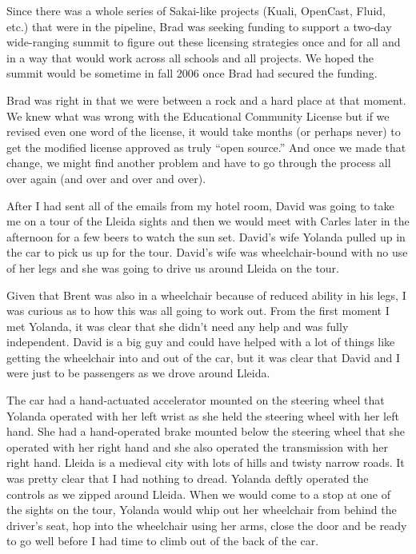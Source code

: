 \documentclass[12pt]{book}
\begin{document}
Since there was a whole series of Sakai-like projects
(Kuali, OpenCast, Fluid, etc.) that were in the pipeline,
Brad was seeking funding to support a two-day wide-ranging
summit to figure out these licensing strategies once and
for all and in a way that would work across all schools and
all projects.  We hoped the summit would be sometime in
fall 2006 once Brad had secured the funding.

Brad was right in that we were between a rock
and a hard place at that moment.  We knew what was wrong with
the Educational Community License but if we revised even
one word of the license, it would take months
(or perhaps never) to get the modified license approved
as truly ``open source.''   And once we made that change,
we might find another problem and have to go through the
process all over again (and over and over and over).

After I had sent all of the emails from my hotel room, David was going
to take me on a tour of the Lleida sights and then we would meet
with Carles later in the afternoon for a few beers to watch the sun set.
David's wife Yolanda pulled up in the car to pick us
up for the tour.  David's wife was wheelchair-bound with no use of
her legs and she was going to drive us around Lleida on the tour.

Given that Brent was also in a wheelchair because of reduced ability
in his legs, I was curious as to how this was all going to work
out.  From the first moment I met Yolanda, it was clear that she
didn't need any help and was fully independent.  David is a big guy
and could have helped with a lot of things like getting the wheelchair
into and out of the car, but it was clear that
David and I were just to be passengers as we drove around
Lleida.

The car had a hand-actuated accelerator mounted on the steering
wheel that Yolanda operated with her left wrist as she held the steering
wheel with her left hand.  She had a hand-operated brake mounted below
the steering wheel that she operated with her right hand and she also
operated the transmission with her right hand.  Lleida is a medieval city
with lots of hills and twisty narrow roads.  It was pretty clear
that I had nothing to dread.   Yolanda deftly operated the controls
as we zipped around Lleida.  When we would come to a stop at one
of the sights on the tour, Yolanda would whip out her wheelchair from
behind the driver's seat, hop into the wheelchair using her arms,
close the door and be ready to go well before I had time to climb out of
the back of the car.
\end{document}
